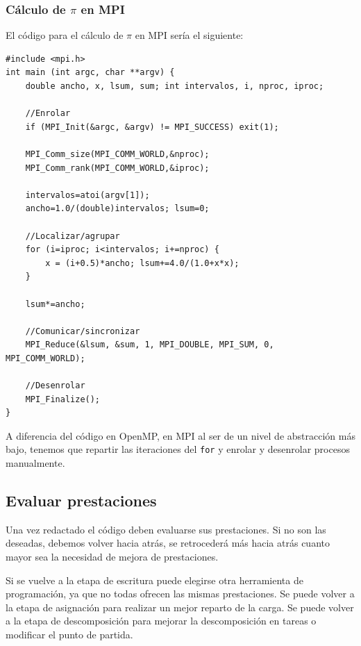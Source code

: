 \documentclass[10pt,a4paper,spanish]{report}
\begin{document}
\textcolor[rgb]{0.2,0.4,0.8}{\subsubsection{Cálculo de $\pi$ en MPI}}
El código para el cálculo de $\pi$ en MPI sería el siguiente:
\begin{verbatim}
#include <mpi.h>
int main (int argc, char **argv) {
    double ancho, x, lsum, sum; int intervalos, i, nproc, iproc;

    //Enrolar
    if (MPI_Init(&argc, &argv) != MPI_SUCCESS) exit(1);

    MPI_Comm_size(MPI_COMM_WORLD,&nproc);
    MPI_Comm_rank(MPI_COMM_WORLD,&iproc);

    intervalos=atoi(argv[1]);
    ancho=1.0/(double)intervalos; lsum=0;

    //Localizar/agrupar
    for (i=iproc; i<intervalos; i+=nproc) {
        x = (i+0.5)*ancho; lsum+=4.0/(1.0+x*x);
    }

    lsum*=ancho;

    //Comunicar/sincronizar
    MPI_Reduce(&lsum, &sum, 1, MPI_DOUBLE, MPI_SUM, 0, MPI_COMM_WORLD);

    //Desenrolar
    MPI_Finalize();
}
\end{verbatim}

A diferencia del código en OpenMP, en MPI al ser de un nivel de abstracción más bajo, tenemos que repartir las iteraciones del \verb*|for| y enrolar y desenrolar procesos manualmente.

\textcolor[rgb]{0.2,0.4,0.8}{\subsection{Evaluar prestaciones}}
Una vez redactado el código deben evaluarse sus prestaciones. Si no son las deseadas, debemos volver hacia atrás, se retrocederá más hacia atrás cuanto mayor sea la necesidad de mejora de prestaciones. 

Si se vuelve a la etapa de escritura puede elegirse otra herramienta de programación, ya que no todas ofrecen las mismas prestaciones. Se puede volver a la etapa de asignación para realizar un mejor reparto de la carga. Se puede volver a la etapa de descomposición para mejorar la descomposición en tareas o modificar el punto de partida.
\end{document}
